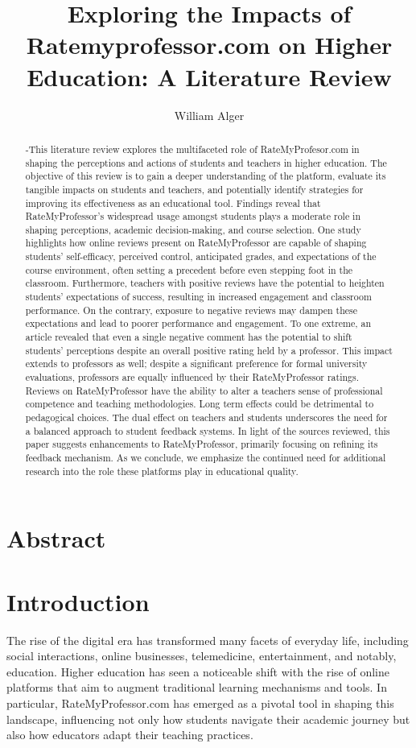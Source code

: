 \documentclass[man, 12pt]{apa7}
\title{Exploring the Impacts of Ratemyprofessor.com on Higher Education: A Literature Review}
\author{William Alger}
\affiliation{Northern Kentucky University}
\begin{document}
\maketitle

\section{Abstract}
\begin{abstract}
-This literature review explores the multifaceted role of RateMyProfesor.com in shaping the perceptions and actions of students and teachers in higher education. 
The objective of this review is to gain a deeper understanding of the platform, evaluate its tangible impacts on students and teachers, and potentially identify strategies for improving its effectiveness as an educational tool. Findings reveal that RateMyProfessor's widespread usage amongst students plays a moderate role in shaping perceptions, academic decision-making, and course selection. One study highlights how online reviews present on RateMyProfessor are capable of shaping students' self-efficacy, perceived control, anticipated grades, and expectations of the course environment, often setting a precedent before even stepping foot in the classroom. Furthermore, teachers with positive reviews have the potential to heighten students' expectations of success, resulting in increased engagement and classroom performance. On the contrary, exposure to negative reviews may dampen these expectations and lead to poorer performance and engagement. To one extreme, an article revealed that even a single negative comment has the potential to shift students' perceptions despite an overall positive rating held by a professor. This impact extends to professors as well; despite a significant preference for formal university evaluations, professors are equally influenced by their RateMyProfessor ratings. Reviews on RateMyProfessor have the ability to alter a teachers sense of professional competence and teaching methodologies. Long term effects could be detrimental to pedagogical choices. The dual effect on teachers and students underscores the need for a balanced approach to student feedback systems. In light of the sources reviewed, this paper suggests enhancements to RateMyProfessor, primarily focusing on refining its feedback mechanism. As we conclude, we emphasize the continued need for additional research into the role these platforms play in educational quality.
\end{abstract}

\section{Introduction}
The rise of the digital era has transformed many facets of everyday life, including social interactions, online businesses, telemedicine, entertainment, and notably, education. Higher education has seen a noticeable shift with the rise of online platforms that aim to augment traditional learning mechanisms and tools. In particular, RateMyProfessor.com has emerged as a pivotal tool in shaping this landscape, influencing not only how students navigate their academic journey but also how educators adapt their teaching practices.
\end{document}

